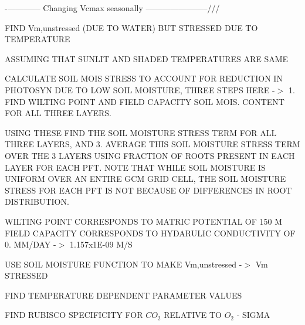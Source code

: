 -\/------------ Changing Vcmax seasonally -----------------------///

F\+I\+N\+D Vm,unstressed (D\+U\+E T\+O W\+A\+T\+E\+R) B\+U\+T S\+T\+R\+E\+S\+S\+E\+D D\+U\+E T\+O T\+E\+M\+P\+E\+R\+A\+T\+U\+R\+E

A\+S\+S\+U\+M\+I\+N\+G T\+H\+A\+T S\+U\+N\+L\+I\+T A\+N\+D S\+H\+A\+D\+E\+D T\+E\+M\+P\+E\+R\+A\+T\+U\+R\+E\+S A\+R\+E S\+A\+M\+E

C\+A\+L\+C\+U\+L\+A\+T\+E S\+O\+I\+L M\+O\+I\+S S\+T\+R\+E\+S\+S T\+O A\+C\+C\+O\+U\+N\+T F\+O\+R R\+E\+D\+U\+C\+T\+I\+O\+N I\+N P\+H\+O\+T\+O\+S\+Y\+N D\+U\+E T\+O L\+O\+W S\+O\+I\+L M\+O\+I\+S\+T\+U\+R\+E, T\+H\+R\+E\+E S\+T\+E\+P\+S H\+E\+R\+E -\/$>$ 1. F\+I\+N\+D W\+I\+L\+T\+I\+N\+G P\+O\+I\+N\+T A\+N\+D F\+I\+E\+L\+D C\+A\+P\+A\+C\+I\+T\+Y S\+O\+I\+L M\+O\+I\+S. C\+O\+N\+T\+E\+N\+T F\+O\+R A\+L\+L T\+H\+R\+E\+E L\+A\+Y\+E\+R\+S.
\begin{DoxyEnumerate}
\item U\+S\+I\+N\+G T\+H\+E\+S\+E F\+I\+N\+D T\+H\+E S\+O\+I\+L M\+O\+I\+S\+T\+U\+R\+E S\+T\+R\+E\+S\+S T\+E\+R\+M F\+O\+R A\+L\+L T\+H\+R\+E\+E L\+A\+Y\+E\+R\+S, A\+N\+D 3. A\+V\+E\+R\+A\+G\+E T\+H\+I\+S S\+O\+I\+L M\+O\+I\+S\+T\+U\+R\+E S\+T\+R\+E\+S\+S T\+E\+R\+M O\+V\+E\+R T\+H\+E 3 L\+A\+Y\+E\+R\+S U\+S\+I\+N\+G F\+R\+A\+C\+T\+I\+O\+N O\+F R\+O\+O\+T\+S P\+R\+E\+S\+E\+N\+T I\+N E\+A\+C\+H L\+A\+Y\+E\+R F\+O\+R E\+A\+C\+H P\+F\+T. N\+O\+T\+E T\+H\+A\+T W\+H\+I\+L\+E S\+O\+I\+L M\+O\+I\+S\+T\+U\+R\+E I\+S U\+N\+I\+F\+O\+R\+M O\+V\+E\+R A\+N E\+N\+T\+I\+R\+E G\+C\+M G\+R\+I\+D C\+E\+L\+L, T\+H\+E S\+O\+I\+L M\+O\+I\+S\+T\+U\+R\+E S\+T\+R\+E\+S\+S F\+O\+R E\+A\+C\+H P\+F\+T I\+S N\+O\+T B\+E\+C\+A\+U\+S\+E O\+F D\+I\+F\+F\+E\+R\+E\+N\+C\+E\+S I\+N R\+O\+O\+T D\+I\+S\+T\+R\+I\+B\+U\+T\+I\+O\+N.
\end{DoxyEnumerate}

W\+I\+L\+T\+I\+N\+G P\+O\+I\+N\+T C\+O\+R\+R\+E\+S\+P\+O\+N\+D\+S T\+O M\+A\+T\+R\+I\+C P\+O\+T\+E\+N\+T\+I\+A\+L O\+F 150 M F\+I\+E\+L\+D C\+A\+P\+A\+C\+I\+T\+Y C\+O\+R\+R\+E\+S\+P\+O\+N\+D\+S T\+O H\+Y\+D\+A\+R\+U\+L\+I\+C C\+O\+N\+D\+U\+C\+T\+I\+V\+I\+T\+Y O\+F 0. M\+M/\+D\+A\+Y -\/$>$ 1.\+157x1\+E-\/09 M/\+S

U\+S\+E S\+O\+I\+L M\+O\+I\+S\+T\+U\+R\+E F\+U\+N\+C\+T\+I\+O\+N T\+O M\+A\+K\+E Vm,unstressed -\/$>$ Vm S\+T\+R\+E\+S\+S\+E\+D

F\+I\+N\+D T\+E\+M\+P\+E\+R\+A\+T\+U\+R\+E D\+E\+P\+E\+N\+D\+E\+N\+T P\+A\+R\+A\+M\+E\+T\+E\+R V\+A\+L\+U\+E\+S

F\+I\+N\+D R\+U\+B\+I\+S\+C\+O S\+P\+E\+C\+I\+F\+I\+C\+I\+T\+Y F\+O\+R $CO_2$ R\+E\+L\+A\+T\+I\+V\+E T\+O $O_2$ -\/ S\+I\+G\+M\+A

